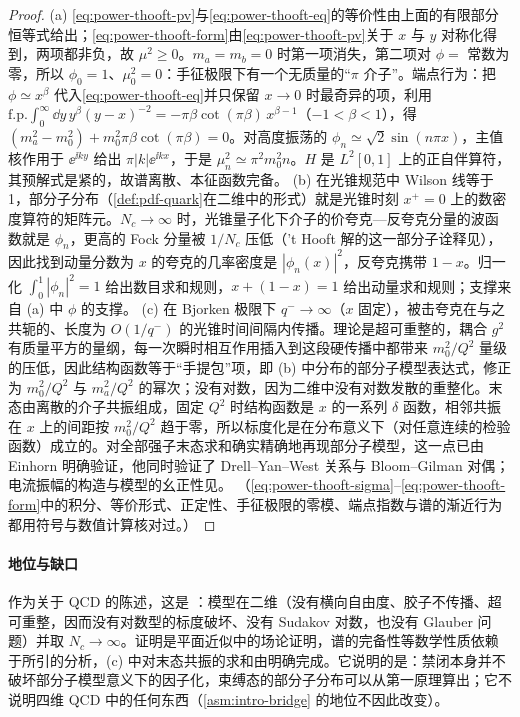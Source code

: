 \begin{proof}
(a) \eqref{eq:power-thooft-pv}与\eqref{eq:power-thooft-eq}的等价性由上面的有限部分恒等式给出；\eqref{eq:power-thooft-form}由\eqref{eq:power-thooft-pv}关于 $x$ 与 $y$ 对称化得到，两项都非负，故 $\mu^2\ge0$。$m_a=m_b=0$ 时第一项消失，第二项对 $\phi=$ 常数为零，所以 $\phi_0=1$、$\mu_0^2=0$：手征极限下有一个无质量的“$\pi$ 介子”。端点行为：把 $\phi\simeq x^\beta$ 代入\eqref{eq:power-thooft-eq}并只保留 $x\to0$ 时最奇异的项，利用 $\mathrm{f.p.}\int_0^\infty\dd y\,y^\beta(y-x)^{-2}=-\pi\beta\cot(\pi\beta)\,x^{\beta-1}$（$-1<\beta<1$），得 $(m_a^2-m_0^2)+m_0^2\pi\beta\cot(\pi\beta)=0$。对高度振荡的 $\phi_n\simeq\sqrt2\sin(n\pi x)$，主值核作用于 $\ee^{\ii ky}$ 给出 $\pi|k|\ee^{\ii kx}$，于是 $\mu_n^2\simeq\pi^2m_0^2n$。$H$ 是 $L^2[0,1]$ 上的正自伴算符，其预解式是紧的，故谱离散、本征函数完备\cite{tHooft1974,Einhorn1976}。
(b) 在光锥规范中 Wilson 线等于 1，部分子分布（\cref{def:pdf-quark}在二维中的形式）就是光锥时刻 $x^+=0$ 上的数密度算符的矩阵元。$N_c\to\infty$ 时，光锥量子化下介子的价夸克—反夸克分量的波函数就是 $\phi_n$，更高的 Fock 分量被 $1/N_c$ 压低（'t Hooft 解的这一部分子诠释见\cite{Einhorn1976}），因此找到动量分数为 $x$ 的夸克的几率密度是 $|\phi_n(x)|^2$，反夸克携带 $1-x$。归一化 $\int_0^1|\phi_n|^2=1$ 给出数目求和规则，$x+(1-x)=1$ 给出动量求和规则；支撑来自 (a) 中 $\phi$ 的支撑。
(c) 在 Bjorken 极限下 $q^-\to\infty$（$x$ 固定），被击夸克在与之共轭的、长度为 $O(1/q^-)$ 的光锥时间间隔内传播。理论是超可重整的，耦合 $g^2$ 有质量平方的量纲，每一次瞬时相互作用插入到这段硬传播中都带来 $m_0^2/Q^2$ 量级的压低，因此结构函数等于“手提包”项，即 (b) 中分布的部分子模型表达式，修正为 $m_0^2/Q^2$ 与 $m_a^2/Q^2$ 的幂次；没有对数，因为二维中没有对数发散的重整化。末态由离散的介子共振组成，固定 $Q^2$ 时结构函数是 $x$ 的一系列 $\delta$ 函数，相邻共振在 $x$ 上的间距按 $m_0^2/Q^2$ 趋于零，所以标度化是在分布意义下（对任意连续的检验函数）成立的。对全部强子末态求和确实精确地再现部分子模型，这一点已由 Einhorn 明确验证，他同时验证了 Drell--Yan--West 关系与 Bloom--Gilman 对偶\cite{Einhorn1976}；电流振幅的构造与模型的幺正性见\cite{CallanCooteGross1976}。
（\eqref{eq:power-thooft-sigma}--\eqref{eq:power-thooft-form}中的积分、等价形式、正定性、手征极限的零模、端点指数与谱的渐近行为都用符号与数值计算核对过。）
\end{proof}

\paragraph{地位与缺口}
作为关于 QCD 的陈述，这是 \tagP：模型在二维（没有横向自由度、胶子不传播、超可重整，因而没有对数型的标度破坏、没有 Sudakov 对数，也没有 Glauber 问题）并取 $N_c\to\infty$。证明是平面近似中的场论证明，谱的完备性等数学性质依赖于所引的分析\cite{tHooft1974,Einhorn1976}，(c) 中对末态共振的求和由\cite{Einhorn1976}明确完成。它说明的是：禁闭本身并不破坏部分子模型意义下的因子化，束缚态的部分子分布可以从第一原理算出；它不说明四维 QCD 中的任何东西（\cref{asm:intro-bridge} 的地位不因此改变）。

